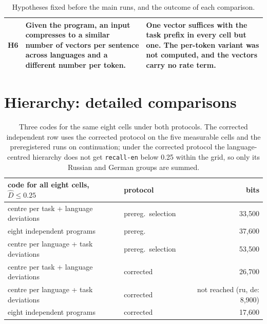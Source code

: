 \documentclass{article}
\newcommand{\Dh}{\hat D}
\newcommand{\cell}[1]{\texttt{#1}}
\begin{document}
\begin{table}[H]
\begin{tabular}{p{}p{}p{}}
H6 & Given the program, an input compresses to a similar number of vectors per sentence across languages and a different number per token. & One vector suffices with the task prefix in every cell but one. The per-token variant was not computed, and the vectors carry no rate term. \\
\bottomrule
\end{tabular}
\caption{Hypotheses fixed before the main runs, and the outcome of each comparison.}
\end{table}

\FloatBarrier
\section{Hierarchy: detailed comparisons}\label{app:hier}
\begin{table}[H]
\centering\small
\begin{tabular}{llr}
\toprule
code for all eight cells, $\Dh\le0.25$ & protocol & bits \\
\midrule
centre per task + language deviations & prereg.\ selection & 33,500 \\
eight independent programs & prereg. & 37,600 \\
centre per language + task deviations & prereg.\ selection & 53,500 \\
centre per task + language deviations & corrected & 26,700 \\
centre per language + task deviations & corrected & not reached (ru, de: 8,900) \\
eight independent programs & corrected & 17,600 \\
\bottomrule
\end{tabular}
\caption{Three codes for the same eight cells under both protocols. The corrected independent row uses the corrected protocol on the five measurable cells and the preregistered runs on continuation; under the corrected protocol the language-centred hierarchy does not get \cell{recall-en} below 0.25 within the grid, so only its Russian and German groups are summed.}
\label{tab:codes}
\end{table}
\end{document}
